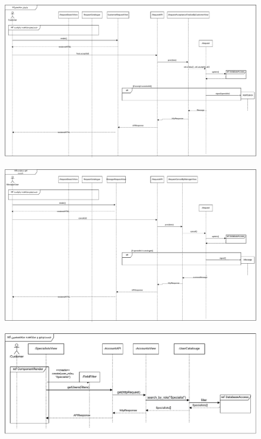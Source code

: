 \begin{figure}[ht!]
	\centering
	\includegraphics[scale=0.8]{figs/design-sequence/3-15.pdf}
\end{figure}
\FloatBarrier
\newpage

\eject \pdfpagewidth=14in \pdfpageheight=12in

\begin{figure}[ht!]
	\centering
	\includegraphics[scale=0.8]{figs/design-sequence/3-16.pdf}
\end{figure}
\FloatBarrier
\newpage


\eject \pdfpagewidth=11in \pdfpageheight=5in

\begin{figure}[ht!]
	\centering
	\includegraphics[scale=0.8]{figs/design-sequence/3-17.pdf}
\end{figure}
\FloatBarrier
\newpage

